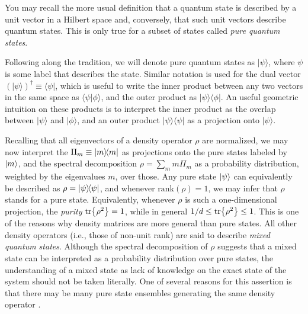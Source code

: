 		You may recall the more usual definition that a quantum state is described by a unit vector in a Hilbert space and, conversely, that such unit vectors describe quantum states. This is only true for a subset of states called \emph{pure quantum states}. 
	
		Following along the tradition, we will denote pure quantum states as $\lvert \psi \rangle$, where $\psi$ is some label that describes the state. Similar notation is used for the dual vector $\left( \lvert \psi \rangle \right)^\dagger \equiv \langle \psi \rvert$, which is useful to write the inner product between any two vectors in the same space as $\langle \psi \vert \phi \rangle$, and the outer product as $\lvert \psi \rangle \langle \phi \rvert$. An useful geometric intuition on these products is to interpret the inner product as the overlap between $\vert \psi \rangle$ and $\vert \phi \rangle$, and an outer product $\lvert \psi \rangle \langle \psi \rvert$ as a projection onto $\lvert  \psi \rangle$.
	
		Recalling that all eigenvectors of a density operator $\rho$ are normalized, we may now interpret the $\Pi_m \equiv \ketbra{m}{m}$ as projections onto the pure states labeled by $\ket{m}$, and the spectral decomposition $\rho = \sum_m m \Pi_m$ as a probability distribution, weighted by the eigenvalues $m$, over those. Any pure state $\ket{\psi}$ can equivalently be described as $\rho = \ketbra{\psi}{\psi}$, and whenever $\text{rank}(\rho) = 1$, we may infer that $\rho$ stands for a pure state. Equivalently, whenever $\rho$ is such a one-dimensional projection, the \emph{purity} $\tr{\rho^2} = 1$, while in general $1/d \leq \tr{\rho^2} \leq 1$. This is one of the reasons why density matrices are more general than pure states. All other density operators (i.e., those of non-unit rank) are said to describe \emph{mixed quantum states}. Although the spectral decomposition of $\rho$ suggests that a mixed state can be interpreted as a probability distribution over pure states, the understanding of a mixed state as lack of knowledge on the exact state of the system should not be taken literally. One of several reasons for this assertion is that there may be many pure state ensembles generating the same density operator \cite{hughston_1993_densitymatrix}.
	

